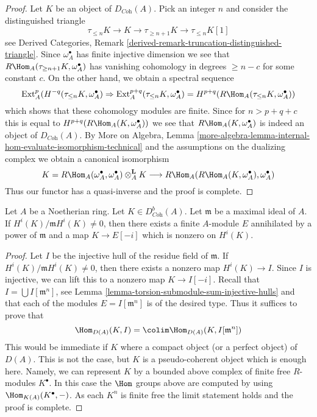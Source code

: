 \begin{proof}
Let $K$ be an object of $D_{\textit{Coh}}(A)$. Pick an integer $n$ and
consider the distinguished triangle
$$
\tau_{\leq n}K \to K \to \tau_{\geq n + 1}K \to \tau_{\leq n}K[1]
$$
see Derived Categories, Remark
\ref{derived-remark-truncation-distinguished-triangle}.
Since $\omega_A^\bullet$ has finite injective dimension we see
that $R\Hom_A(\tau_{\geq n + 1}K, \omega_A^\bullet)$ has vanishing
cohomology in degrees $\geq n - c$ for some constant $c$.
On the other hand, we obtain a spectral sequence
$$
\text{Ext}_A^p(H^{-q}(\tau_{\leq n}K, \omega_A^\bullet)
\Rightarrow
\text{Ext}_A^{p + q}(\tau_{\leq n}K, \omega_A^\bullet) =
H^{p + q}(R\Hom_A(\tau_{\leq n}K, \omega_A^\bullet))
$$
which shows that these cohomology modules are finite. Since for
$n > p + q + c$ this is equal to $H^{p + q}(R\Hom_A(K, \omega_A^\bullet))$
we see that $R\Hom_A(K, \omega_A^\bullet)$ is indeed an object
of $D_{\textit{Coh}}(A)$.
By More on Algebra, Lemma
\ref{more-algebra-lemma-internal-hom-evaluate-isomorphism-technical}
and the assumptions on the dualizing complex
we obtain a canonical isomorphism
$$
K = R\Hom_A(\omega_A^\bullet, \omega_A^\bullet) \otimes_A^\mathbf{L} K
\longrightarrow
R\Hom_A(R\Hom_A(K, \omega_A^\bullet), \omega_A^\bullet)
$$
Thus our functor has a quasi-inverse and the proof is complete.
\end{proof}

\begin{lemma}
\label{lemma-detect-cohomology}
Let $A$ be a Noetherian ring. Let $K \in D^b_{\textit{Coh}}(A)$.
Let $\mathfrak m$ be a maximal ideal of $A$.
If $H^i(K)/\mathfrak m H^i(K) \not = 0$, then there exists a finite
$A$-module $E$ annihilated by a power of $\mathfrak m$
and a map $K \to E[-i]$ which is nonzero on $H^i(K)$.
\end{lemma}

\begin{proof}
Let $I$ be the injective hull of the residue field of $\mathfrak m$.
If $H^i(K)/\mathfrak m H^i(K) \not = 0$, then there exists a nonzero
map $H^i(K) \to I$. Since $I$ is injective, we can lift this to a
nonzero map $K \to I[-i]$. Recall that $I = \bigcup I[\mathfrak m^n]$,
see Lemma \ref{lemma-torsion-submodule-sum-injective-hulls}
and that each of the modules $E = I[\mathfrak m^n]$ is of the
desired type. Thus it suffices to prove that
$$
\Hom_{D(A)}(K, I) = \colim \Hom_{D(A)}(K, I[\mathfrak m^n])
$$
This would be immediate if $K$ where a compact object
(or a perfect object) of $D(A)$. This is not the case, but
$K$ is a pseudo-coherent object which is enough here. Namely,
we can represent $K$ by a bounded above complex of finite
free $R$-modules $K^\bullet$. In this case the $\Hom$ groups
above are computed by using $\Hom_{K(A)}(K^\bullet, -)$.
As each $K^n$ is finite free the limit statement holds and the
proof is complete.
\end{proof}

